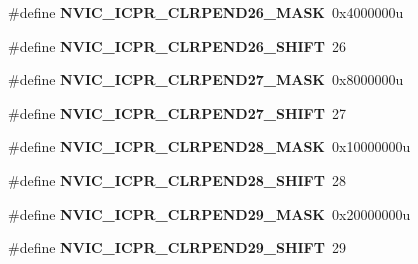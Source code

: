 \begin{DoxyCompactItemize}
\mbox{\label{group___n_v_i_c___register___masks_ga9e51fcc3ff6e7fcaf81ecbef7707e20c}} 
\#define {\bfseries N\+V\+I\+C\+\_\+\+I\+C\+P\+R\+\_\+\+C\+L\+R\+P\+E\+N\+D26\+\_\+\+M\+A\+SK}~0x4000000u
\item 
\mbox{\label{group___n_v_i_c___register___masks_ga657bd2af6a0f6582089c1a97885c483d}} 
\#define {\bfseries N\+V\+I\+C\+\_\+\+I\+C\+P\+R\+\_\+\+C\+L\+R\+P\+E\+N\+D26\+\_\+\+S\+H\+I\+FT}~26
\item 
\mbox{\label{group___n_v_i_c___register___masks_ga0178c55b7023bc98079d5453a8459f5c}} 
\#define {\bfseries N\+V\+I\+C\+\_\+\+I\+C\+P\+R\+\_\+\+C\+L\+R\+P\+E\+N\+D27\+\_\+\+M\+A\+SK}~0x8000000u
\item 
\mbox{\label{group___n_v_i_c___register___masks_gaa75d4162cb20140c58c7e6a9a6cd244e}} 
\#define {\bfseries N\+V\+I\+C\+\_\+\+I\+C\+P\+R\+\_\+\+C\+L\+R\+P\+E\+N\+D27\+\_\+\+S\+H\+I\+FT}~27
\item 
\mbox{\label{group___n_v_i_c___register___masks_ga056bf976f30a1a25cd15632ad8bea77a}} 
\#define {\bfseries N\+V\+I\+C\+\_\+\+I\+C\+P\+R\+\_\+\+C\+L\+R\+P\+E\+N\+D28\+\_\+\+M\+A\+SK}~0x10000000u
\item 
\mbox{\label{group___n_v_i_c___register___masks_ga3408d12a544213de0a51da980b630103}} 
\#define {\bfseries N\+V\+I\+C\+\_\+\+I\+C\+P\+R\+\_\+\+C\+L\+R\+P\+E\+N\+D28\+\_\+\+S\+H\+I\+FT}~28
\item 
\mbox{\label{group___n_v_i_c___register___masks_gad26492cb22f95a48d13ba9f63af51482}} 
\#define {\bfseries N\+V\+I\+C\+\_\+\+I\+C\+P\+R\+\_\+\+C\+L\+R\+P\+E\+N\+D29\+\_\+\+M\+A\+SK}~0x20000000u
\item 
\mbox{\label{group___n_v_i_c___register___masks_gac7e9279ab315d663b8584ac1d8d46b66}} 
\#define {\bfseries N\+V\+I\+C\+\_\+\+I\+C\+P\+R\+\_\+\+C\+L\+R\+P\+E\+N\+D29\+\_\+\+S\+H\+I\+FT}~29
\item 
\mbox{\label{group___n_v_i_c___register___masks_ga742b5481c4ffee9beb01334f7788f0b2}} 

\end{DoxyCompactItemize}

